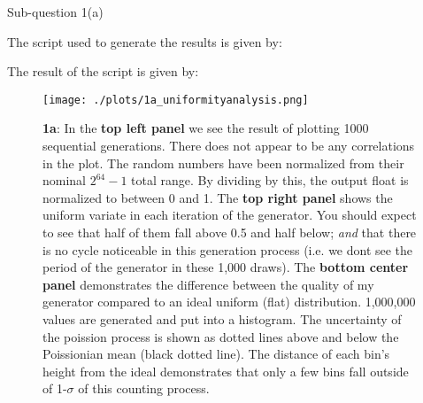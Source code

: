 
\begin{subsection}{Sub-question 1(a)}

The script used to generate the results is given by:
  


The result of the script is given by:




\begin{figure}[h!]
  \centering
  \texttt{[image: ./plots/1a\_uniformityanalysis.png]}
  \caption{\textbf{1a}: In the \textbf{top left panel} we see the result of plotting 1000 sequential generations. There does not appear to be any correlations in the plot. The random numbers have been normalized from their nominal $2^{64}-1$ total range. By dividing by this, the output float is normalized to between 0 and 1. The \textbf{top right panel} shows the uniform variate in each iteration of the generator. You should expect to see that half of them fall above 0.5 and half below; \textit{and} that there is no cycle noticeable in this generation process (i.e. we dont see the period of the generator in these 1,000 draws). The \textbf{bottom center panel} demonstrates the difference between the quality of my generator compared to an ideal uniform (flat) distribution. 1,000,000 values are generated and put into a histogram. The uncertainty of the poission process is shown as dotted lines above and below the Poissionian mean (black dotted line). The distance of each bin's height from the ideal demonstrates that only a few bins fall outside of 1-$\sigma$ of this counting process.}
  \label{fig:rngquality}
\end{figure}


\end{subsection}


\FloatBarrier

